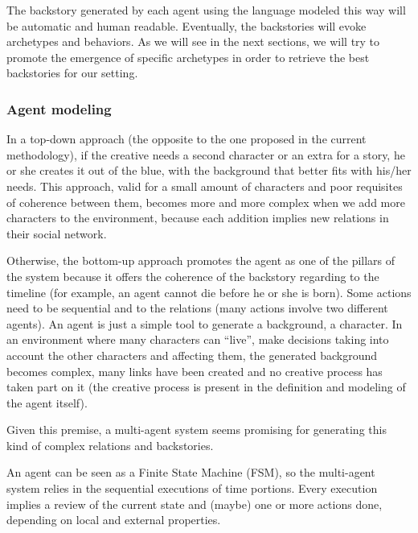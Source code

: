 \documentclass[letterpaper]{article}
\begin{document}
The backstory generated by each agent using the language modeled this way will be automatic and human readable. Eventually, the backstories will evoke archetypes and behaviors. As we will see in the next sections, we will try to promote the emergence of specific archetypes in order to retrieve the best backstories for our setting.



\subsubsection{Agent modeling}


In a top-down approach (the opposite to the one proposed in the current methodology), if the creative needs a second character or an extra for a story, he or she creates it out of the blue, with the background that better fits with his/her needs. This approach, valid for a small amount of characters and poor requisites of coherence between them, becomes more and more complex when we add more characters to the environment, because each addition implies new relations in their social network.


Otherwise, the bottom-up approach promotes the agent as one of the pillars of the system because it offers the coherence of the backstory regarding to the timeline (for example, an agent cannot die before he or she is born). Some actions need to be sequential and to the relations (many actions involve two different agents). An agent is just a simple tool to generate a background, a character. In an environment where many characters can ``live'', make decisions taking into account the other characters and affecting them, the generated background becomes complex, many links have been created and no creative process has taken part on it (the creative process is present in the definition and modeling of the agent itself).

Given this premise, a multi-agent system seems promising for generating this kind of complex relations and backstories.

An agent can be seen as a Finite State Machine (FSM), so the multi-agent system relies in the sequential executions of time portions. Every execution implies a review of the current state and (maybe) one or more actions done, depending on local and external properties.\\

\end{document}
